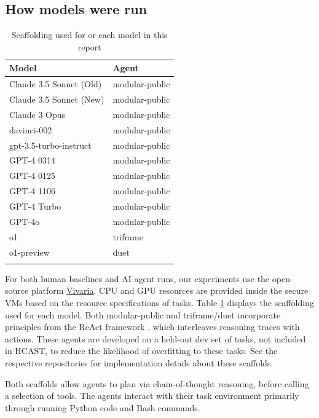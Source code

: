 \documentclass{article}
\newcommand{\gabenchmark}{HCAST}
\begin{document}
\subsection{How models were run}
\label{app:how-run}
\begin{table}[]
    \centering
    \begin{tabular}{ll}
\hline
\textbf{Model} & \textbf{Agent}  \\
\hline
Claude 3.5 Sonnet (Old) & modular-public \\
Claude 3.5 Sonnet (New) & modular-public  \\
Claude 3 Opus & modular-public \\
davinci-002 & modular-public  \\
gpt-3.5-turbo-instruct & modular-public \\
GPT-4 0314 & modular-public \\
GPT-4 0125 & modular-public  \\
GPT-4 1106 & modular-public  \\
GPT-4 Turbo & modular-public  \\
GPT-4o & modular-public  \\
o1 & triframe \\
o1-preview & duet  \\
\hline\\
\end{tabular}
    \caption{Scaffolding used for or each model in this report}
    \label{tab:agent-scaffolds}
\end{table}

For both human baselines and AI agent runs, our experiments use the open-source platform \href{https://vivaria.metr.org/}{Vivaria}. CPU and GPU resources are provided inside the secure VMs based on the resource specifications of tasks. Table \ref{tab:agent-scaffolds} displays the scaffolding used for each model. Both modular-public and triframe/duet incorporate principles from the ReAct framework \citep{yao2023reactsynergizingreasoningacting}, which interleaves reasoning traces with actions. These agents are developed on a held-out dev set of tasks, not included in \gabenchmark{}, to reduce the likelihood of overfitting to these tasks. See the respective repositories for implementation details about these scaffolds.

Both scaffolds allow agents to plan via chain-of-thought reasoning, before calling a selection of tools. The agents interact with their task environment primarily through running Python code and Bash commands.
\end{document}

